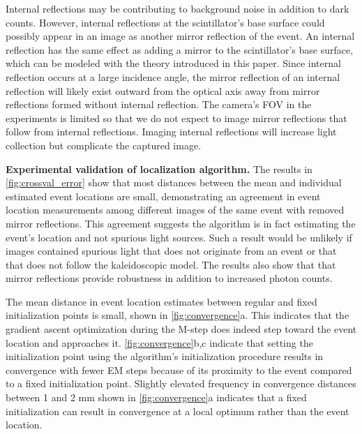 Internal reflections may be contributing to background noise in addition to dark counts.
However, internal reflections at the scintillator's base surface could possibly 
appear in an image as another mirror reflection of the event.
An internal reflection has the same effect as adding a mirror to the 
scintillator's base surface, which can be modeled with the theory introduced in 
this paper.
Since internal reflection occurs at a large incidence angle, the 
mirror reflection of an internal reflection will likely exist 
outward from the optical axis away from mirror reflections formed 
without internal reflection. 
The camera's FOV in the experiments is limited so that we do not 
expect to image mirror reflections that follow from internal reflections.
Imaging internal reflections will increase light collection but complicate the 
captured image.

\noindent
\textbf{Experimental validation of localization algorithm.}
The results in \cref{fig:crossval_error} show that most distances between the mean 
and individual estimated event locations are small, demonstrating an agreement in 
event location measurements among different images of the same event with removed 
mirror reflections.
This agreement suggests the algorithm is in fact estimating the event's location 
and not spurious light sources.
Such a result would be unlikely if images contained spurious light that does not 
originate from an event or that that does not follow the kaleidoscopic model.
The results also show that that mirror reflections provide robustness in 
addition to increased photon counts.

The mean distance in event location estimates between regular and fixed 
initialization points is small, shown in \cref{fig:convergence}a.
This indicates that the gradient ascent optimization during the M-step does indeed step toward the event location and approaches it.
\cref{fig:convergence}b,c indicate that setting the initialization point using the 
algorithm's initialization procedure results in convergence with fewer EM steps 
because of its proximity to the event compared to a fixed initialization point. 
Slightly elevated frequency in convergence distances between 1 and 2 mm shown in 
\cref{fig:convergence}a indicates that a fixed initialization can result in 
convergence at a local optimum rather than the event location.

